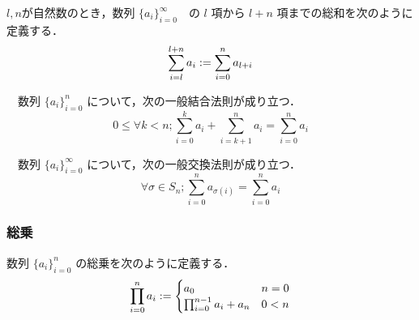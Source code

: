 \documentclass{book} %
\begin{document}
					\begin{dfn} $l,n$が自然数のとき，数列 $\{a_i\}_{i=0}^{\infty}$　の $l$ 項から $l + n$ 項までの総和を次のように定義する．
						\begin{equation}
							\sum_{i=l}^{l+n} a_i := \sum_{i=0}^{n} a_{l+i}
						\end{equation}
					\end{dfn}
					
					\begin{thm}[結合法則]　数列 $\{a_i\}_{i=0}^{n}$ について，次の一般結合法則が成り立つ．
						\begin{equation}
							0 \le \forall k < n ; \sum_{i=0}^{k} a_i + \sum_{i=k+1}^{n} a_i = \sum_{i=0}^{n} a_i
						\end{equation} 
					\end{thm}
					
					\begin{thm}[交換法則]　数列 $\{a_i\}_{i=0}^{\infty}$ について，次の一般交換法則が成り立つ．
						\begin{equation}
							\forall \sigma \in S_n ; \sum_{i=0}^{n} a_{\sigma(i)}  = \sum_{i=0}^{n} a_i
						\end{equation} 
					\end{thm}
					\subsubsection{総乗}
					\begin{dfn} 数列 $\{a_i\}_{i=0}^{n}$ の総乗を次のように定義する．
						\begin{equation}
							\prod_{i=0}^{n} a_i := \begin{cases}
								a_0 & n = 0 \\
								\prod_{i=0}^{n-1} a_i + a_{n} &  0 < n
							\end{cases}
						\end{equation}
					\end{dfn}
\end{document}
